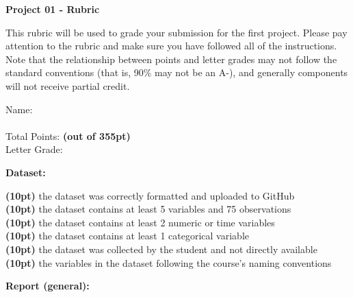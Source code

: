 \documentclass[12pt]{article}
\begin{document}
\begin{center}
{\bf Project 01 - Rubric} \\
\end{center}

\bigskip

This rubric will be used to grade your submission for the first
project. Please pay attention to the rubric and make sure you have
followed all of the instructions. Note that the relationship between
points and letter grades may not follow the standard conventions
(that is, 90\% may not be an A-), and generally components will not
receive partial credit.

\bigskip

Name: \underline{\hspace{3cm}} \\  \\
Total Points: \underline{\hspace{1cm}} \textbf{(out of 355pt)} \\
Letter Grade: \underline{\hspace{3cm}}

\bigskip

\textbf{Dataset:} \vspace{6pt}

\underline{\hspace{1cm}} \textbf{(10pt)}
  the dataset was correctly formatted and uploaded to GitHub \\
\underline{\hspace{1cm}} \textbf{(10pt)}
  the dataset contains at least 5 variables and 75 observations \\
\underline{\hspace{1cm}} \textbf{(10pt)}
  the dataset contains at least 2 numeric or time variables \\
\underline{\hspace{1cm}} \textbf{(10pt)}
  the dataset contains at least 1 categorical variable \\
\underline{\hspace{1cm}} \textbf{(10pt)}
  the dataset was collected by the student and not directly available \\
\underline{\hspace{1cm}} \textbf{(10pt)}
  the variables in the dataset following the course's naming conventions \\

\medskip

\textbf{Report (general):} \vspace{6pt}
\end{document}
